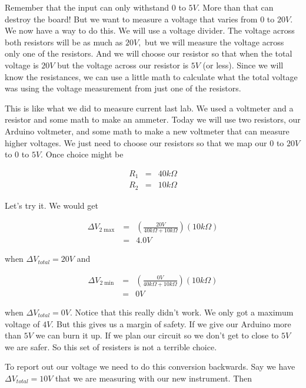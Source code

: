 Remember that the input can only withstand $0$ to $5\unit{V}.$ More than
that can destroy the board! But we want to measure a voltage that varies
from $0$ to $20\unit{V}.$ We now have a way to do this. We will use a
voltage divider. The voltage across both resistors will be as much as $20%
\unit{V},$ but we will measure the voltage across only one of the resistors.
And we will choose our resistor so that when the total voltage is $20\unit{V}
$ but the voltage across our resistor is $5\unit{V}$ (or less). Since we
will know the resistances, we can use a little math to calculate what the
total voltage was using the voltage measurement from just one of the
resistors.

This is like what we did to measure current last lab. We used a voltmeter
and a resistor and some math to make an ammeter. Today we will use two
resistors, our Arduino voltmeter, and some math to make a new voltmeter that
can measure higher voltages. We just need to choose our resistors so that we
map our $0$ to $20\unit{V}$ to $0$ to $5\unit{V}.$ Once choice might be 

\begin{eqnarray*}
	R_{1} &=&40\unit{k \Omega} \\
	R_{2} &=&10\unit{k \Omega}
\end{eqnarray*}

Let's try it. We would get

\begin{eqnarray*}
	\Delta V_{2\max } &=&\left( \frac{20\unit{V}}{40\unit{k \Omega }
	+10\unit{k \Omega }}\right) \left( 10\unit{k \Omega }\right) \\
	&=&4.0\unit{V}
\end{eqnarray*}

when $\Delta V_{total}=20\unit{V}$ and 

\begin{eqnarray*}
\Delta V_{2\min } &=&\left( \frac{0\unit{V}}{40\unit{k \Omega}
	+10\unit{k\Omega}}\right) \left( 10\unit{k\Omega}\right) \\
	&=&0\unit{V}
\end{eqnarray*}

when $\Delta V_{total}=0\unit{V}.$ Notice that this really didn't work. We
only got a maximum voltage of $4\unit{V}.$ But this gives us a margin of
safety. If we give our Arduino more than $5\unit{V}$ we can burn it up. If
we plan our circuit so we don't get to close to $5\unit{V}$ we are safer. So
this set of resisters is not a terrible choice.

To report out our voltage we need to do this conversion backwards. Say we
have $\Delta V_{total}=10\unit{V}$ that we are measuring with our new
instrument. Then 

